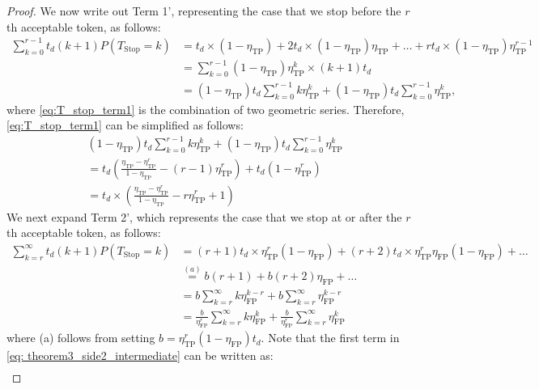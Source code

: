 \documentclass{article}
\theoremstyle{plain}
\theoremstyle{definition}
\theoremstyle{remark}
\begin{document}
\begin{proof}
    We now write out Term 1', representing the case that we stop before the $r$th acceptable token, as follows:
    \begin{align}
    \sum_{k=0}^{r-1} t_d(k+1)P(T_\text{Stop}=k) &= t_d\times(1-\eta_\text{TP}) + 2t_d\times(1-\eta_\text{TP})\eta_\text{TP} +  \ldots + rt_d\times (1-\eta_\text{TP})\eta_\text{TP}^{r-1}\nonumber\\
        &=\sum_{k=0}^{r-1}(1-\eta_\text{TP})\eta_\text{TP}^{k}\times(k+1)t_d \nonumber\\
        & =(1-\eta_\text{TP})t_d\sum_{k=0}^{r-1}k\eta_\text{TP}^{k} + (1-\eta_\text{TP})t_d\sum_{k=0}^{r-1}\eta_\text{TP}^{k}, \label{eq:T_stop_term1}
    \end{align}
    where \eqref{eq:T_stop_term1} is the combination of two geometric series. Therefore, \eqref{eq:T_stop_term1} can be simplified as follows:
    \begin{align}
        &(1-\eta_\text{TP})t_d\sum_{k=0}^{r-1}k\eta_\text{TP}^{k} + (1-\eta_\text{TP})t_d\sum_{k=0}^{r-1}\eta_\text{TP}^{k} \nonumber\\
        &= t_d \left(\frac{\eta_\text{TP}-\eta_\text{TP}^{r}}{1-\eta_\text{TP}} -(r-1)\eta_\text{TP}^{r}\right) + t_d(1-\eta_\text{TP}^r) \nonumber\\
        &=t_d\times\left(\frac{\eta_\text{TP}-\eta_\text{TP}^{r}}{1-\eta_\text{TP}}-r\eta_\text{TP}^{r}+1\right) \label{eq: theorem3_side1}
    \end{align}
    We next expand Term 2', which represents the case that we stop at or after the $r$th acceptable token, as follows:
    \begin{align}
        \sum_{k=r}^{\infty}t_d(k+1)P(T_\text{Stop}=k)&=(r+1)t_d\times\eta_\text{TP}^r(1-\eta_\text{FP}) + (r+2)t_d\times\eta_\text{TP}^r \eta_\text{FP}(1-\eta_\text{FP}) + \ldots  \nonumber\\
        &\stackrel{(a)}= b(r+1) + b(r+2)\eta_\text{FP} +  \ldots \nonumber\\
        &= b\sum_{k=r}^{\infty} k\eta_\text{FP}^{k-r} + b\sum_{k=r}^{\infty} \eta_\text{FP}^{k-r}\nonumber\\
         &= \frac{b}{\eta_\text{FP}^r}\sum_{k=r}^{\infty} k\eta_\text{FP}^{k}+ \frac{b}{\eta_\text{FP}^r}\sum_{k=r}^{\infty} \eta_\text{FP}^{k} \label{eq: theorem3_side2_intermediate}
    \end{align}
    where (a) follows from setting $b = \eta_\text{TP}^r(1-\eta_\text{FP})t_d$.
    Note that the first term in \eqref{eq: theorem3_side2_intermediate} can be written as:
    \begin{align}

\end{align}
\end{proof}
\end{document}

